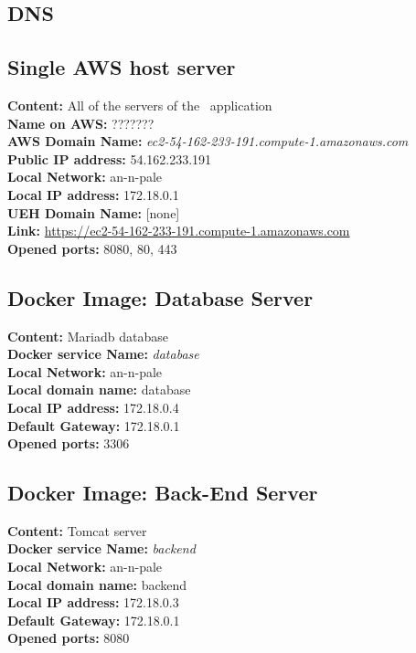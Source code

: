 \begin{appendices}
		\section{DNS}
			\subsection{Single AWS host server}
				\textbf{Content:} All of the servers of the \projectName\ application \\
				\indent\textbf{Name on AWS:} ??????? \\
				\indent\textbf{AWS Domain Name:} {\itshape ec2-54-162-233-191.compute-1.amazonaws.com} \\
				\indent\textbf{Public IP address:} 54.162.233.191 \\
				\indent\textbf{Local Network:} an-n-pale \\
				\indent\textbf{Local IP address:} 172.18.0.1 \\
				\indent\textbf{UEH Domain Name:} [none] \\
				\indent\textbf{Link:} \url{https://ec2-54-162-233-191.compute-1.amazonaws.com} \\
				\indent\textbf{Opened ports:} 8080, 80, 443 \\
				
			\subsection{Docker Image: Database Server}
				\textbf{Content:} Mariadb database \\
				\indent\textbf{Docker service Name:} {\itshape database} \\
				\indent\textbf{Local Network:} an-n-pale \\
				\indent\textbf{Local domain name:} database \\
				\indent\textbf{Local IP address:} 172.18.0.4 \\
				\indent\textbf{Default Gateway:} 172.18.0.1 \\
				\indent\textbf{Opened ports:} 3306 \\
				
			\subsection{Docker Image: Back-End Server}
				\textbf{Content:} Tomcat server \\
				\indent\textbf{Docker service Name:} {\itshape backend} \\
				\indent\textbf{Local Network:} an-n-pale \\
				\indent\textbf{Local domain name:} backend \\
				\indent\textbf{Local IP address:} 172.18.0.3 \\
				\indent\textbf{Default Gateway:} 172.18.0.1 \\
				\indent\textbf{Opened ports:} 8080 \\
				

\end{appendices}
